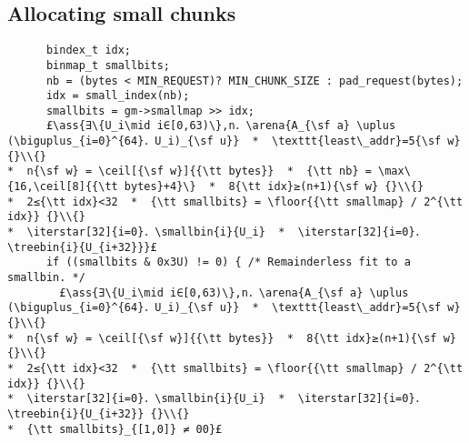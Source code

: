 \documentclass[10pt,twoside]{report}
\makeatletter
\newcommand{\ml}[2][t]{\mbox{\mdseries\begin{tabular}[#1]{@{}L@{}}#2\end{tabular}}}
\newcommand{\ass}[1]{\ensuremath{{\color{blue}\left\{\ml[c]{#1}\right\}}}}
\renewcommand{\floor}[2][]{\left\lfloor{#2}\right\rfloor_{#1}}
\renewcommand{\ceil}[2][]{\left\lceil{#2}\right\rceil_{#1}}
\newcommand{\iterstar}[2][]{\text{\LARGE $*$}^{#1}_{#2}}
\makeatother
\begin{document}
\subsection*{Allocating small chunks}\label{sect:allocating_small_chunks}
\begin{lstlisting}
      bindex_t idx;
      binmap_t smallbits;
      nb = (bytes < MIN_REQUEST)? MIN_CHUNK_SIZE : pad_request(bytes);    
      idx = small_index(nb);
      smallbits = gm->smallmap >> idx;
      £\ass{∃\{U_i\mid i∈[0,63)\},n．\arena{A_{\sf a} \uplus (\biguplus_{i=0}^{64}．U_i)_{\sf u}}  *  \texttt{least\_addr}=5{\sf w} {}\\{}
*  n{\sf w} = \ceil[{\sf w}]{{\tt bytes}}  *  {\tt nb} = \max\{16,\ceil[8]{{\tt bytes}+4}\}  *  8{\tt idx}≥(n+1){\sf w} {}\\{}
*  2≤{\tt idx}<32  *  {\tt smallbits} = \floor{{\tt smallmap} / 2^{\tt idx}} {}\\{}
*  \iterstar[32]{i=0}．\smallbin{i}{U_i}  *  \iterstar[32]{i=0}．\treebin{i}{U_{i+32}}}£
      if ((smallbits & 0x3U) != 0) { /* Remainderless fit to a smallbin. */
        £\ass{∃\{U_i\mid i∈[0,63)\},n．\arena{A_{\sf a} \uplus (\biguplus_{i=0}^{64}．U_i)_{\sf u}}  *  \texttt{least\_addr}=5{\sf w} {}\\{}
*  n{\sf w} = \ceil[{\sf w}]{{\tt bytes}}  *  8{\tt idx}≥(n+1){\sf w} {}\\{}
*  2≤{\tt idx}<32  *  {\tt smallbits} = \floor{{\tt smallmap} / 2^{\tt idx}} {}\\{}
*  \iterstar[32]{i=0}．\smallbin{i}{U_i}  *  \iterstar[32]{i=0}．\treebin{i}{U_{i+32}} {}\\{}
*  {\tt smallbits}_{[1,0]} ≠ 00}£
\end{lstlisting}
\end{document}
